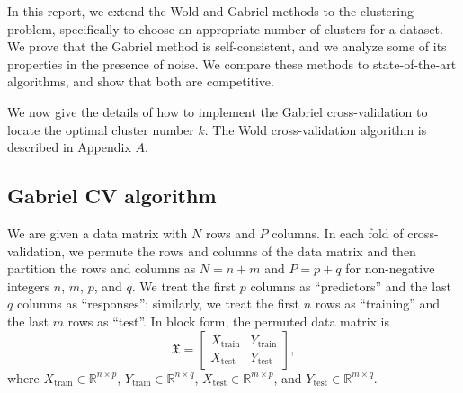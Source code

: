 \documentclass[12pt]{article}
\newcommand{\R}{\mathbb{R}}
\newcommand{\dataX}{\mathfrak{X}}
\newcommand{\Xtrain}{X_{\text{train}}}
\newcommand{\Ytrain}{Y_{\text{train}}}
\newcommand{\Xtest}{X_{\text{test}}}
\newcommand{\Ytest}{Y_{\text{test}}}
\begin{document}
In this report, we extend the Wold and Gabriel methods to the clustering
problem, specifically to choose an appropriate number of clusters for a
dataset.  We prove that the Gabriel method is self-consistent, and we analyze
some of its properties in the presence of noise.  We compare these methods to
state-of-the-art algorithms, and show that both are competitive.


We now give the details of how to implement
the Gabriel cross-validation to locate the optimal cluster number $k$. The
Wold cross-validation algorithm is described in Appendix $A$.

\subsection{Gabriel CV algorithm}
\label{sec:gabriel-cv-algorithm}
We are given a data matrix with $N$ rows and $P$ columns.  In each fold of
cross-validation, we permute the rows and columns of the data matrix and then
partition the rows and columns as $N = n + m$ and $P = p + q$ for 
non-negative integers $n$, $m$, $p$, and $q$.  We treat the first $p$
columns as ``predictors'' and the last $q$ columns as ``responses'';
similarly, we treat the first $n$ rows as ``training'' and the last $m$ rows
as ``test''.  In block form, the permuted data matrix is
\[
  \dataX
  =
  \begin{bmatrix}
    \Xtrain & \Ytrain \\
    \Xtest  & \Ytest
  \end{bmatrix},
\]
where
$\Xtrain \in \R^{n \times p}$,
$\Ytrain \in \R^{n \times q}$,
$\Xtest \in  \R^{m \times p}$,
and
$\Ytest \in  \R^{m \times q}$.
\end{document}
